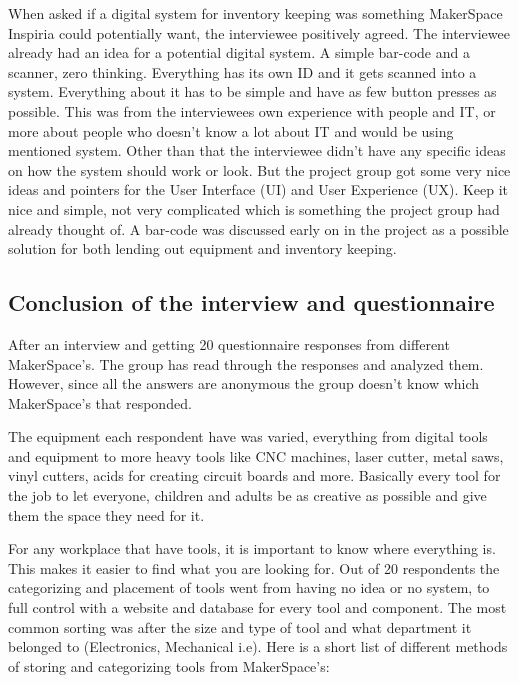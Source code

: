 When asked if a digital system for inventory keeping was something MakerSpace Inspiria could potentially want, the interviewee positively agreed. The interviewee already had an idea for a potential digital system. A simple bar-code and a scanner, zero thinking. Everything has its own ID and it gets scanned into a system. Everything about it has to be simple and have as few button presses as possible. This was from the interviewees own experience with people and IT, or more about people who doesn't know a lot about IT and would be using mentioned system. Other than that the interviewee didn't have any specific ideas on how the system should work or look. But the project group got some very nice ideas and pointers for the User Interface (UI) and User Experience (UX). Keep it nice and simple, not very complicated which is something the project group had already thought of. A bar-code was discussed early on in the project as a possible solution for both lending out equipment and inventory keeping. 

\subsection{Conclusion of the interview and questionnaire}

After an interview and getting 20 questionnaire responses from different MakerSpace's. The group has read through the responses and analyzed them. However, since all the answers are anonymous the group doesn't know which MakerSpace's that responded.   

The equipment each respondent have was varied, everything from digital tools and equipment to more heavy tools like CNC machines, laser cutter, metal saws, vinyl cutters, acids for creating circuit boards and more. Basically every tool for the job to let everyone, children and adults be as creative as possible and give them the space they need for it. 

For any workplace that have tools, it is important to know where everything is. This makes it easier to find what you are looking for. Out of 20 respondents the categorizing and placement of tools went from having no idea or no system, to full control with a website and database for every tool and component. The most common sorting was after the size and type of tool and what department it belonged to (Electronics, Mechanical i.e). Here is a short list of different methods of storing and categorizing tools from MakerSpace's:

